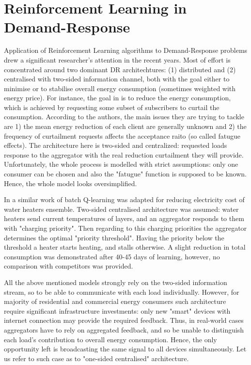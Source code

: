 \section{Reinforcement Learning in Demand-Response}
Application of Reinforcement Learning algorithms to Demand-Response problems drew a significant researcher's attention in the recent years. Most of effort is concentrated around two dominant DR architechtures: (1) distributed and (2) centralised with two-sided information channel, both with the goal either to minimise or to stabilise overall energy consumption (sometimes weighted with energy price). For instance, the goal in \cite{Kalathil2015} is to reduce the energy consumption, which is achieved by requesting some subset of subscribers to curtail the consumption. According to the authors, the main issues they are trying to tackle are 1) the mean energy reduction of each client are generally unknown and 2) the frequency of curtailment requests affects the acceptance raito (so called fatugue effects). The architecture here is two-sided and centralized: requested loads response to the aggregator with the real reduction curtailment they will provide. Unfortunately, the whole process is modelled with strict assumptions: only one consumer can be chosen and also the "fatugue" function is supposed to be known. Hence, the whole model looks oversimplified. 

In a similar work of \cite{Ruelens2014} batch Q-learning was adapted for reducing electricity cost of water heaters ensemble. Two-sided centralised architecture was assumed: water heaters send current temperatures of layers, and an aggregator responds to them with "charging priority". Then regarding to this charging priorities the aggregator determines the optimal "priority threshold". Having the priority below the threshold a heater starts heating, and stalls otherwise. A slight reduction in total consumption was demonstrated after 40-45 days of learning, however, no comparison with competitors was provided. 

All the above mentioned models strongly rely on the two-sided information stream, so to be able to communicate with each load individually. However, for majority of residential and commercial energy consumers such architecture require significant infrastructure investments: only new "smart" devices with internet connection may provide the required feedback. Thus, in real-world cases aggregators have to rely on aggregated feedback, and so be unable to distinguish each load's contribution to overall energy consumption. Hence, the only opportunity left is broadcasting the same signal to all devices simultaneously. Let us refer to such case as to "one-sided centralised" architecture.

